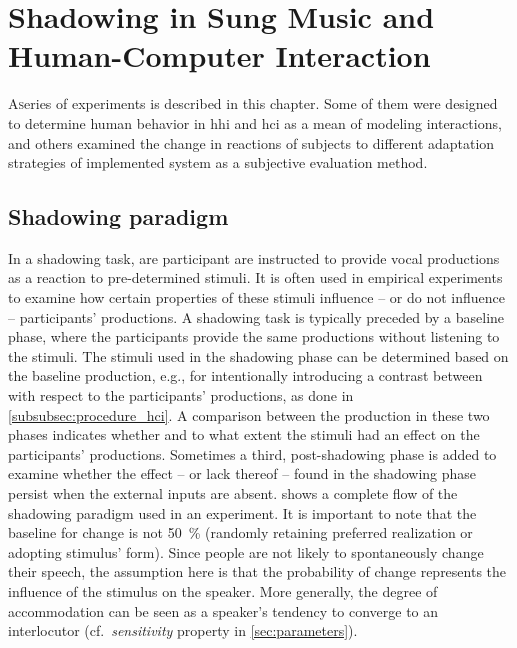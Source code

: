 \chapter{Shadowing in Sung Music and Human-Computer Interaction}
\label{chap:shadowing_in_sung_music_and_human_computer_interaction}

\lettrine{A} series of experiments is described in this chapter.
Some of them were designed to determine human behavior in \acl{hhi} and \ac{hci} as a mean of modeling interactions, and others examined the change in reactions of subjects to different adaptation strategies of implemented system as a subjective evaluation method.

\pagebreak

\section{Shadowing paradigm}
\label{sec:shadowing_paradigm}

In a shadowing task, are participant are instructed to provide vocal productions as a reaction to pre-determined stimuli.
It is often used in empirical experiments \citep[e.g.,][]{Goldinger1998echoes} to examine how certain properties of these stimuli influence -- or do not influence -- participants' productions.
A shadowing task is typically preceded by a baseline phase, where the participants provide the same productions without listening to the stimuli.
The stimuli used in the shadowing phase can be determined based on the baseline production, e.g., for intentionally introducing a contrast between with respect to the participants' productions, as done in \cref{subsubsec:procedure_hci}.
A comparison between the production in these two phases indicates whether and to what extent the stimuli had an effect on the participants' productions.
Sometimes a third, post-shadowing phase is added to examine whether the effect -- or lack thereof -- found in the shadowing phase persist when the external inputs are absent.
 shows a complete flow of the shadowing paradigm used in an experiment.
It is important to note that the baseline for change is not \SI{50}{\percent} (randomly retaining preferred realization or adopting stimulus' form).
Since people are not likely to spontaneously change their speech, the assumption here is that the probability of change represents the influence of the stimulus on the speaker.
More generally, the degree of accommodation can be seen as a speaker's tendency to converge to an interlocutor (cf.\ \emph{sensitivity} property in \cref{sec:parameters}).

